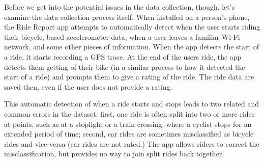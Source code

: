 \documentclass[12pt,twoside]{reedthesis}
\begin{document}
  Before we get into the potential issues in the data collection, though,
  let's examine the data collection process itself. When installed on a
  person's phone, the Ride Report app attempts to automatically detect
  when the user starts riding their bicycle, based accelerometer data,
  when a user leaves a familiar Wi-Fi network, and some other pieces of
  information. When the app detects the start of a ride, it starts
  recording a GPS trace. At the end of the users ride, the app detects
  them getting of their bike (in a similar process to how it detected the
  start of a ride) and prompts them to give a rating of the ride. The ride
  data are saved then, even if the user does not provide a rating.
  
  This automatic detection of when a ride starts and stops leads to two
  related and common errors in the dataset: first, one ride is often split
  into two or more rides at points, such as at a stoplight or a train
  crossing, where a cyclist stops for an extended period of time; second,
  car rides are sometimes misclassified as bicycle rides and vice-versa
  (car rides are not rated.) The app allows riders to correct the
  misclassification, but provides no way to join split rides back
  together.
  
\end{document}
